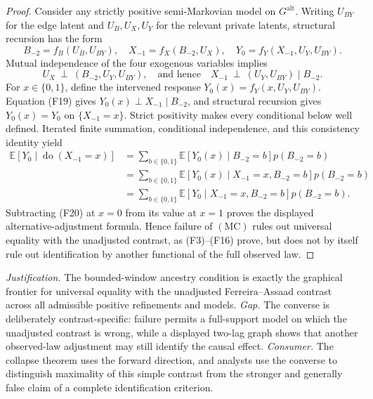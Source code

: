 \documentclass{article}
\begin{document}
\begin{proof}
Consider any strictly positive semi-Markovian model on \(G^{\mathrm{alt}}\).  Writing \(U_{BY}\) for the edge latent and \(U_B,U_X,U_Y\) for the relevant private latents, structural recursion has the form
\[
B_{-2}=f_B(U_B,U_{BY}),
\quad
X_{-1}=f_X(B_{-2},U_X),
\quad
Y_0=f_Y(X_{-1},U_Y,U_{BY}).
\tag{F18}
\]
Mutual independence of the four exogenous variables implies
\[
U_X\ \perp\ (B_{-2},U_Y,U_{BY}),
\quad\text{and hence}\quad
X_{-1}\ \perp\ (U_Y,U_{BY})\mid B_{-2}.
\tag{F19}
\]
For \(x\in\{0,1\}\), define the intervened response \(Y_0(x)=f_Y(x,U_Y,U_{BY})\).  Equation (F19) gives \(Y_0(x)\perp X_{-1}\mid B_{-2}\), and structural recursion gives \(Y_0(x)=Y_0\) on \(\{X_{-1}=x\}\).  Strict positivity makes every conditional below well defined.  Iterated finite summation, conditional independence, and this consistency identity yield
\[
\begin{aligned}
\mathbb E[Y_0\mid\operatorname{do}(X_{-1}=x)]
&=\sum_{b\in\{0,1\}}\mathbb E[Y_0(x)\mid B_{-2}=b]p(B_{-2}=b)\\
&=\sum_{b\in\{0,1\}}\mathbb E[Y_0(x)\mid X_{-1}=x,B_{-2}=b]p(B_{-2}=b)\\
&=\sum_{b\in\{0,1\}}\mathbb E[Y_0\mid X_{-1}=x,B_{-2}=b]p(B_{-2}=b).
\end{aligned}
\tag{F20}
\]
Subtracting (F20) at \(x=0\) from its value at \(x=1\) proves the displayed alternative-adjustment formula.  Hence failure of \(\mathrm{(MC)}\) rules out universal equality with the unadjusted contrast, as (F3)--(F16) prove, but does not by itself rule out identification by another functional of the full observed law.
\end{proof}
\par\smallskip\noindent \textit{Justification.} The bounded-window ancestry condition is exactly the graphical frontier for universal equality with the unadjusted Ferreira--Assaad contrast across all admissible positive refinements and models. \textit{Gap.} The converse is deliberately contrast-specific: failure permits a full-support model on which the unadjusted contrast is wrong, while a displayed two-lag graph shows that another observed-law adjustment may still identify the causal effect. \textit{Consumer.} The collapse theorem uses the forward direction, and analysts use the converse to distinguish maximality of this simple contrast from the stronger and generally false claim of a complete identification criterion.
\end{document}
